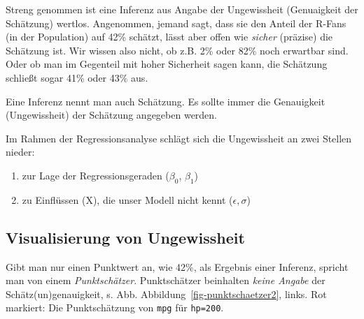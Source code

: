 \documentclass[
  a4paper,
  DIV=11]{scrreprt}
\providecommand{\tightlist}{%
  \setlength{\itemsep}{0pt}\setlength{\parskip}{0pt}}\usepackage{longtable,booktabs,array}
\theoremstyle{definition}
\theoremstyle{remark}
\begin{document}
Streng genommen ist eine Inferenz aus Angabe der Ungewissheit
(Genuaigkeit der Schätzung) wertlos. Angenommen, jemand sagt, dass sie
den Anteil der R-Fans (in der Population) auf 42\% schätzt, lässt aber
offen wie \emph{sicher} (präzise) die Schätzung ist. Wir wissen also
nicht, ob z.B. 2\% oder 82\% noch erwartbar sind. Oder ob man im
Gegenteil mit hoher Sicherheit sagen kann, die Schätzung schließt sogar
41\% oder 43\% aus.

\begin{tcolorbox}[enhanced jigsaw, title=\textcolor{quarto-callout-important-color}{\faExclamation}\hspace{0.5em}{Wichtig}, bottomtitle=1mm, bottomrule=.15mm, titlerule=0mm, colbacktitle=quarto-callout-important-color!10!white, colframe=quarto-callout-important-color-frame, leftrule=.75mm, left=2mm, toprule=.15mm, colback=white, arc=.35mm, breakable, toptitle=1mm, opacityback=0, rightrule=.15mm, coltitle=black, opacitybacktitle=0.6]

Eine Inferenz nennt man auch Schätzung. Es sollte immer die Genauigkeit
(Ungewissheit) der Schätzung angegeben werden.

\end{tcolorbox}

Im Rahmen der Regressionsanalyse schlägt sich die Ungewissheit an zwei
Stellen nieder:

\begin{enumerate}
\def\labelenumi{\arabic{enumi}.}
\tightlist
\item
  zur Lage der Regressionsgeraden (\(\beta_0\), \(\beta_1\))
\item
  zu Einflüssen (X), die unser Modell nicht kennt (\(\epsilon, \sigma\))
\end{enumerate}

\hypertarget{visualisierung-von-ungewissheit}{%
\subsection{Visualisierung von
Ungewissheit}\label{visualisierung-von-ungewissheit}}

Gibt man nur einen Punktwert an, wie 42\%, als Ergebnis einer Inferenz,
spricht man von einem \emph{Punktschätzer}. Punktschätzer beinhalten
\emph{keine Angabe} der Schätz(un)genauigkeit, s. Abb.
Abbildung~\ref{fig-punktschaetzer2}, links. Rot markiert: Die
Punktschätzung von \texttt{mpg} für \texttt{hp=200}.
\end{document}
